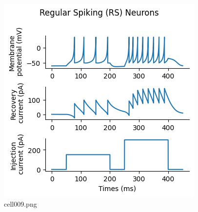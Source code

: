\begin{figure}[ht]
	\centering
	\includegraphics[scale=0.8, max width=\linewidth]{./fig/neuron-model/izhikevich/cell009.png}
	\caption{cell009.png}
	\label{cell009.png}
\end{figure}